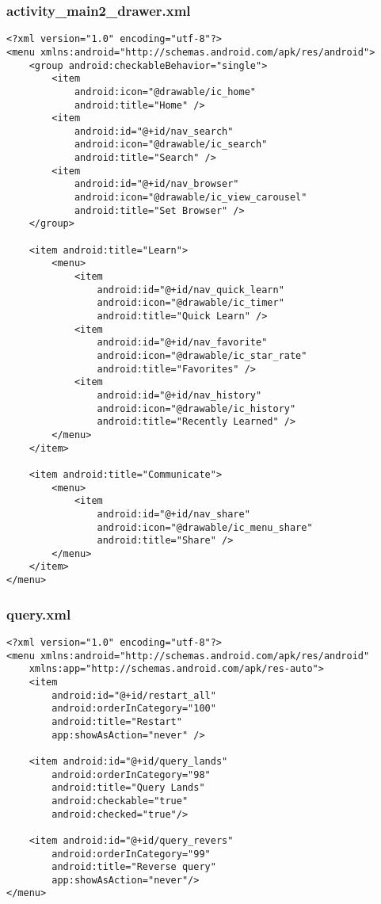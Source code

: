 \subsubsection{activity\_main2\_drawer.xml}
\begin{lstlisting}
<?xml version="1.0" encoding="utf-8"?>
<menu xmlns:android="http://schemas.android.com/apk/res/android">
    <group android:checkableBehavior="single">
        <item
            android:icon="@drawable/ic_home"
            android:title="Home" />
        <item
            android:id="@+id/nav_search"
            android:icon="@drawable/ic_search"
            android:title="Search" />
        <item
            android:id="@+id/nav_browser"
            android:icon="@drawable/ic_view_carousel"
            android:title="Set Browser" />
    </group>

    <item android:title="Learn">
        <menu>
            <item
                android:id="@+id/nav_quick_learn"
                android:icon="@drawable/ic_timer"
                android:title="Quick Learn" />
            <item
                android:id="@+id/nav_favorite"
                android:icon="@drawable/ic_star_rate"
                android:title="Favorites" />
            <item
                android:id="@+id/nav_history"
                android:icon="@drawable/ic_history"
                android:title="Recently Learned" />
        </menu>
    </item>

    <item android:title="Communicate">
        <menu>
            <item
                android:id="@+id/nav_share"
                android:icon="@drawable/ic_menu_share"
                android:title="Share" />
        </menu>
    </item>
</menu>
\end{lstlisting}

\subsubsection{query.xml}
\begin{lstlisting}
<?xml version="1.0" encoding="utf-8"?>
<menu xmlns:android="http://schemas.android.com/apk/res/android"
    xmlns:app="http://schemas.android.com/apk/res-auto">
    <item
        android:id="@+id/restart_all"
        android:orderInCategory="100"
        android:title="Restart"
        app:showAsAction="never" />

    <item android:id="@+id/query_lands"
        android:orderInCategory="98"
        android:title="Query Lands"
        android:checkable="true"
        android:checked="true"/>

    <item android:id="@+id/query_revers"
        android:orderInCategory="99"
        android:title="Reverse query"
        app:showAsAction="never"/>
</menu>
\end{lstlisting}

